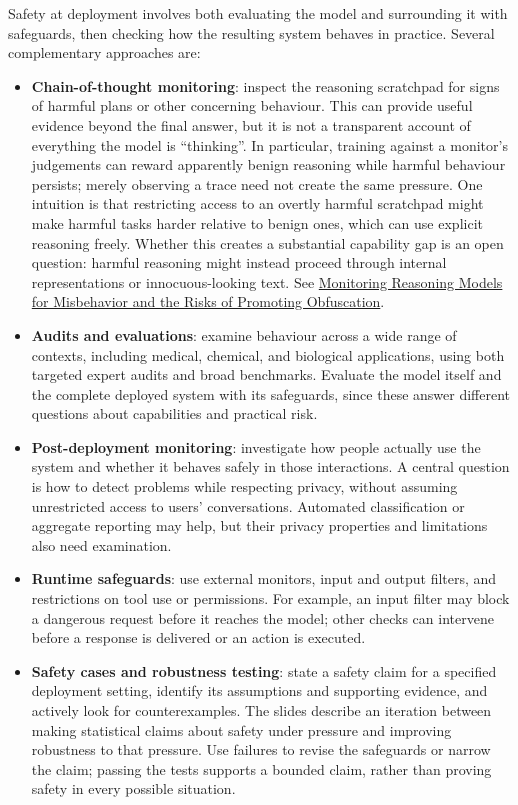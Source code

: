 Safety at deployment involves both evaluating the model and surrounding it with safeguards, then checking how the resulting system behaves in practice. Several complementary approaches are:
\begin{itemize}
  \item \textbf{Chain-of-thought monitoring}: inspect the reasoning scratchpad for signs of harmful plans or other concerning behaviour. This can provide useful evidence beyond the final answer, but it is not a transparent account of everything the model is ``thinking''. In particular, training against a monitor's judgements can reward apparently benign reasoning while harmful behaviour persists; merely observing a trace need not create the same pressure. One intuition is that restricting access to an overtly harmful scratchpad might make harmful tasks harder relative to benign ones, which can use explicit reasoning freely. Whether this creates a substantial capability gap is an open question: harmful reasoning might instead proceed through internal representations or innocuous-looking text. See \href{https://arxiv.org/abs/2503.11926}{Monitoring Reasoning Models for Misbehavior and the Risks of Promoting Obfuscation}.
  \item \textbf{Audits and evaluations}: examine behaviour across a wide range of contexts, including medical, chemical, and biological applications, using both targeted expert audits and broad benchmarks. Evaluate the model itself and the complete deployed system with its safeguards, since these answer different questions about capabilities and practical risk.
  \item \textbf{Post-deployment monitoring}: investigate how people actually use the system and whether it behaves safely in those interactions. A central question is how to detect problems while respecting privacy, without assuming unrestricted access to users' conversations. Automated classification or aggregate reporting may help, but their privacy properties and limitations also need examination.
  \item \textbf{Runtime safeguards}: use external monitors, input and output filters, and restrictions on tool use or permissions. For example, an input filter may block a dangerous request before it reaches the model; other checks can intervene before a response is delivered or an action is executed.
  \item \textbf{Safety cases and robustness testing}: state a safety claim for a specified deployment setting, identify its assumptions and supporting evidence, and actively look for counterexamples. The slides describe an iteration between making statistical claims about safety under pressure and improving robustness to that pressure. Use failures to revise the safeguards or narrow the claim; passing the tests supports a bounded claim, rather than proving safety in every possible situation.

\end{itemize}
